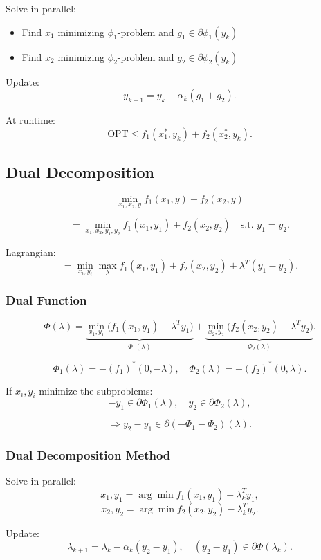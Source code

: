 \documentclass[12pt,oneside]{book}
\numberwithin{equation}{section}
\theoremstyle{definition}
\theoremstyle{plain}
\theoremstyle{remark}
\begin{document}
Solve in parallel:
\begin{itemize}
\item Find $x_1$ minimizing $\phi_1$-problem and $g_1 \in \partial \phi_1(y_k)$
\item Find $x_2$ minimizing $\phi_2$-problem and $g_2 \in \partial \phi_2(y_k)$
\end{itemize}

Update:
\[
y_{k+1} = y_k - \alpha_k (g_1 + g_2).
\]

At runtime:
\[
\mathrm{OPT} \le f_1(x_1^*,y_k) + f_2(x_2^*,y_k).
\]

\subsection{Dual Decomposition}

\[
\min_{x_1,x_2,y} f_1(x_1,y) + f_2(x_2,y)
\]

\[
=
\min_{x_1,x_2,y_1,y_2} f_1(x_1,y_1) + f_2(x_2,y_2)
\quad \text{s.t. } y_1 = y_2.
\]

Lagrangian:
\[
=
\min_{x_i,y_i} \max_\lambda
f_1(x_1,y_1) + f_2(x_2,y_2) + \lambda^T(y_1 - y_2).
\]

\subsubsection*{Dual Function}

\[
\Phi(\lambda)
=
\underbrace{\min_{x_1,y_1} \big(f_1(x_1,y_1) + \lambda^T y_1\big)}_{\Phi_1(\lambda)}
+
\underbrace{\min_{x_2,y_2} \big(f_2(x_2,y_2) - \lambda^T y_2\big)}_{\Phi_2(\lambda)}.
\]

\[
\Phi_1(\lambda) = -(f_1)^*(0,-\lambda),
\quad
\Phi_2(\lambda) = -(f_2)^*(0,\lambda).
\]

If $x_i,y_i$ minimize the subproblems:
\[
- y_1 \in \partial \Phi_1(\lambda),
\quad
y_2 \in \partial \Phi_2(\lambda),
\]

\[
\Rightarrow
y_2 - y_1 \in \partial(-\Phi_1 - \Phi_2)(\lambda).
\]

\subsubsection*{Dual Decomposition Method}

Solve in parallel:
\[
x_1,y_1 = \arg\min f_1(x_1,y_1) + \lambda_k^T y_1,
\]
\[
x_2,y_2 = \arg\min f_2(x_2,y_2) - \lambda_k^T y_2.
\]

Update:
\[
\lambda_{k+1} = \lambda_k - \alpha_k (y_2 - y_1),
\quad
(y_2 - y_1) \in \partial \Phi(\lambda_k).
\]
\end{document}
